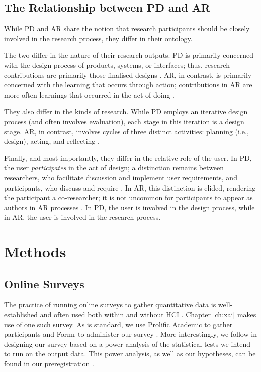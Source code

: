 \subsection{The Relationship between PD and AR}
While PD and AR share the notion that research participants should be closely involved in the research process, they differ in their ontology.

The two differ in the nature of their research outputs. PD is primarily concerned with the design process of products, systems, or interfaces; thus, research contributions are primarily those finalised designs \cite{zimmerman_research_2014}. AR, in contrast, is primarily concerned with the learning that occurs through action; contributions in AR are more often learnings that occurred in the act of doing \cite{Hult1980TOWARDSAD}. 

They also differ in the kinds of research. While PD employs an iterative design process (and often involves evaluation), each stage in this iteration is a design stage. AR, in contrast, involves cycles of three distinct activities: planning (i.e., design), acting, and reflecting \cite{Hult1980TOWARDSAD}.

Finally, and most importantly, they differ in the relative role of the user. In PD, the user \emph{participates} in the act of design; a distinction remains between researchers, who facilitate discussion and implement user requirements, and participants, who discuss and require \cite{Hussain2014OverviewOV}. In AR, this distinction is elided, rendering the participant a co-researcher; it is not uncommon for participants to appear as authors in AR processes \cite{Hayes_2011}. In PD, the user is involved in the design process, while in AR, the user is involved in the research process.

\section{Methods} %
\subsection{Online Surveys}
The practice of running online surveys to gather quantitative data is well-established and often used both within and without HCI \cite{zhao2023fairness,pillai_adoption_2020,krishna_disagreement_2022,mai_user_nodate,bansal_does_2021,binns_its_2018,dzindolet_role_2003,papenmeier_its_2022}. Chapter \ref{ch:xai} makes use of one such survey. As is standard, we use Prolific Academic to gather participants and Formr to administer our survey \cite{binns_its_2018,Arslan_formr_2019}. More interestingly, we follow \textcite{caldwell_power_nodate} in designing our survey based on a power analysis of the statistical tests we intend to run on the output data. This power analysis, as well as our hypotheses, can be found in our preregistration \cite{natarajan_binns_2022}. %

